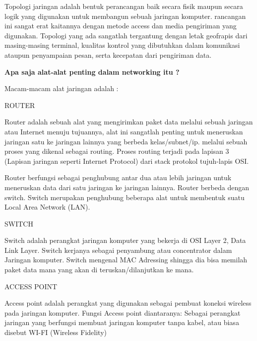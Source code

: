 \documentclass{wileySix}
\begin{document}
\vspace{12pt}
Topologi jaringan adalah bentuk perancangan baik secara fisik maupun secara logik yang digunakan untuk membangun sebuah jaringan komputer. rancangan ini sangat erat kaitannya dengan metode access dan media pengiriman yang digunakan. Topologi yang ada sangatlah tergantung dengan letak geofrapis dari masing-masing terminal, kualitas kontrol yang dibutuhkan dalam komunikasi ataupun penyampaian pesan, serta kecepatan dari pengiriman data. \par
\noindent 
\textbf{Apa saja alat-alat penting dalam networking itu ?} \par
\noindent 
Macam-macam alat jaringan adalah :  \par
\noindent 
\begin{myEnumerate}
	\item ROUTER  \par
	Router adalah sebuah alat yang mengirimkan paket data melalui sebuah jaringan atau Internet menuju tujuannya, alat ini sangatlah penting untuk meneruskan jaringan satu ke jaringan lainnya yang berbeda kelas/subnet/ip. melalui sebuah proses yang dikenal sebagai routing. Proses routing terjadi pada lapisan 3 (Lapisan jaringan seperti Internet Protocol) dari stack protokol tujuh-lapis OSI. \par
	\vspace{12pt}
	Router berfungsi sebagai penghubung antar dua atau lebih jaringan untuk meneruskan data dari satu jaringan ke jaringan lainnya. Router berbeda dengan switch. Switch merupakan penghubung beberapa alat untuk membentuk suatu Local Area Network (LAN). \par
	\vspace{12pt}
	\noindent 
	\item SWITCH \par
	Switch adalah perangkat jaringan komputer yang bekerja di OSI Layer 2, Data Link Layer. Switch kerjanya sebagai penyambung atau concentrator dalam Jaringan komputer. Switch mengenal MAC Adressing shingga dia bisa memilah paket data mana yang akan di teruskan/dilanjutkan ke mana. \par
	\vspace{12pt}
	\noindent 
	\item ACCESS POINT\end{myEnumerate}
\par
Access point adalah perangkat yang digunakan sebagai pembuat koneksi wireless pada jaringan komputer. Fungsi Access point diantaranya: Sebagai perangkat jaringan yang berfungsi membuat jaringan komputer tanpa kabel, atau biasa disebut WI-FI (Wireless Fidelity) \par
\end{document}
